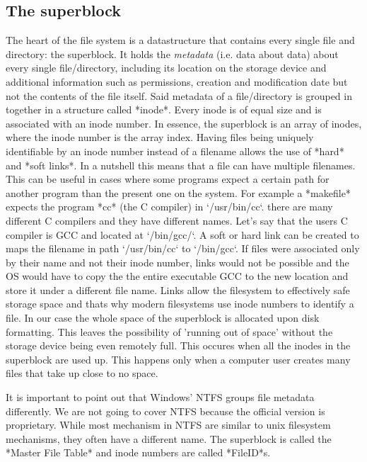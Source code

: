 \subsection{The superblock}

The heart of the file system is a datastructure that contains every single file and directory: the
superblock. It holds the \textit{metadata} (i.e. data about data) about every single file/directory,
including its location on the storage device and additional information such as permissions, creation
and modification date but not the contents of the file itself. Said metadata of a file/directory is
grouped in together in a structure called *inode*. Every inode is of equal size and is associated
with an inode number. In essence, the superblock is an array of inodes, where the inode number is the
array index. Having files being uniquely identifiable by an inode number instead of a filename allows 
the use of *hard* and *soft links*. In a nutshell this means that a file can have multiple filenames.
This can be useful in cases where some programs expect a certain path for another program than the
present one on the system. For example a *makefile* expects the program *cc* (the C compiler) in
`/usr/bin/cc`. there are many different C compilers and they have different names. Let's say that the
users C compiler is GCC and located at `/bin/gcc/`. A soft or hard link can be created to maps the
filename in path `/usr/bin/cc` to `/bin/gcc`. If files were associated only by their name and not 
their inode number, links would not be possible and the OS would have to copy the the entire
executable GCC to the new location and store it under a different file name. Links allow the
filesystem to effectively safe storage space and thats why modern filesystems use inode numbers to
identify a file. In our case the whole space of the superblock is allocated upon disk formatting.
This leaves the possibility of 'running out of space' without the storage device being even remotely
full. This occures when all the inodes in the superblock are used up. This happens only when a
computer user creates many files that take up close to no space.

It is important to point out that Windows' NTFS groups file metadata differently. We are not going to
cover NTFS because the official version is proprietary. While most mechanism in NTFS are similar to
unix filesystem mechanisms, they often have a different name. The superblock is called the *Master
File Table* and inode numbers are called *FileID*s.

